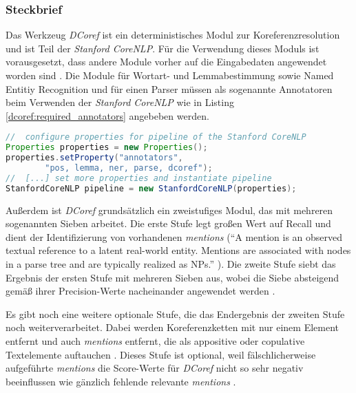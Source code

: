 
\subsubsection{Steckbrief}

Das Werkzeug \emph{DCoref} ist ein deterministisches Modul zur Koreferenzresolution und ist Teil der \emph{Stanford CoreNLP}. Für die Verwendung dieses Moduls ist vorausgesetzt, dass andere Module vorher auf die Eingabedaten angewendet worden sind \autocite[]{chris_stanford_dcoref}. Die Module für Wortart- und Lemmabestimmung sowie Named Entitiy Recognition und für einen Parser müssen als sogenannte Annotatoren beim Verwenden der \emph{Stanford CoreNLP} wie in Listing \ref{dcoref:required_annotators} angebeben werden.

\begin{lstlisting}[label=dcoref:required_annotators, language=Java, caption=Angabe vorausgesetzter Annotatoren in Java]
//	configure properties for pipeline of the Stanford CoreNLP
Properties properties = new Properties();
properties.setProperty("annotators", 
		"pos, lemma, ner, parse, dcoref");
//	[...] set more properties and instantiate pipeline
StanfordCoreNLP pipeline = new StanfordCoreNLP(properties);
\end{lstlisting}

\noindent Außerdem ist \emph{DCoref} grundsätzlich ein zweistufiges Modul, das mit mehreren sogenannten Sieben arbeitet. Die erste Stufe legt großen Wert auf Recall und dient der Identifizierung von vorhandenen \emph{mentions} (\hyphenquote{UKenglish}{A mention is an observed textual reference to a latent real-world entity. Mentions are associated with nodes in a parse tree and are typically realized as NPs.} \autocite[S. 385 f.]{chris_haghighi}). Die zweite Stufe siebt das Ergebnis der ersten Stufe mit mehreren Sieben aus, wobei die Siebe absteigend gemäß ihrer Precision-Werte nacheinander angewendet werden \autocite[S. 28 f.]{chris_leeetal}. 

Es gibt noch eine weitere optionale Stufe, die das Endergebnis der zweiten Stufe noch weiterverarbeitet. Dabei werden Koreferenzketten mit nur einem Element entfernt und auch \emph{mentions} entfernt, die als appositive oder copulative Textelemente auftauchen \autocite[29]{chris_leeetal}. Dieses Stufe ist optional, weil fälschlicherweise aufgeführte \emph{mentions} die Score-Werte für \emph{DCoref} nicht so sehr negativ beeinflussen wie gänzlich fehlende relevante \emph{mentions} \autocite[32]{chris_leeetal}.


